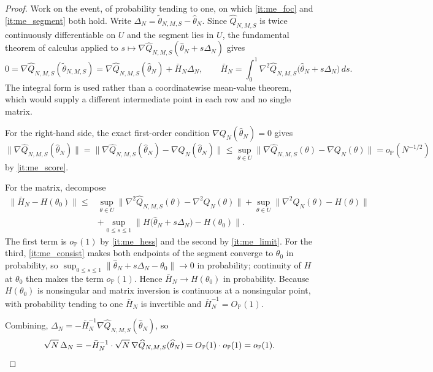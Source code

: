 \documentclass[11pt]{article}
\theoremstyle{definition}
\newcommand{\Pp}{\mathbb{P}}
\newcommand{\op}{o_{\Pp}}
\newcommand{\Op}{O_{\Pp}}
\newcommand{\thetao}{\theta_0}
\begin{document}
\begin{proof}
Work on the event, of probability tending to one, on which \ref{it:me_foc} and \ref{it:me_segment} both hold. Write $\Delta_N=\widetilde\theta_{N,M,S}-\widehat\theta_N$. Since $\widehat Q_{N,M,S}$ is twice continuously differentiable on $U$ and the segment lies in $U$, the fundamental theorem of calculus applied to $s\mapsto\nabla\widehat Q_{N,M,S}(\widehat\theta_N+s\Delta_N)$ gives
\[
0=\nabla\widehat Q_{N,M,S}(\widetilde\theta_{N,M,S})
=\nabla\widehat Q_{N,M,S}(\widehat\theta_N)+\bar H_N\Delta_N,
\qquad
\bar H_N=\int_0^1\nabla^2\widehat Q_{N,M,S}\bigl(\widehat\theta_N+s\Delta_N\bigr)\,ds .
\]
The integral form is used rather than a coordinatewise mean-value theorem, which would supply a different intermediate point in each row and no single matrix.

For the right-hand side, the exact first-order condition $\nabla Q_N(\widehat\theta_N)=0$ gives
\[
\bigl\|\nabla\widehat Q_{N,M,S}(\widehat\theta_N)\bigr\|
=\bigl\|\nabla\widehat Q_{N,M,S}(\widehat\theta_N)-\nabla Q_N(\widehat\theta_N)\bigr\|
\le\sup_{\theta\in U}\bigl\|\nabla\widehat Q_{N,M,S}(\theta)-\nabla Q_N(\theta)\bigr\|
=o_{\Pp}(N^{-1/2})
\]
by \ref{it:me_score}.

For the matrix, decompose
\begin{align*}
\bigl\|\bar H_N-H(\thetao)\bigr\|
\le{}&\sup_{\theta\in U}\bigl\|\nabla^2\widehat Q_{N,M,S}(\theta)-\nabla^2Q_N(\theta)\bigr\|
+\sup_{\theta\in U}\bigl\|\nabla^2Q_N(\theta)-H(\theta)\bigr\|\\
&+\sup_{0\le s\le1}\bigl\|H\bigl(\widehat\theta_N+s\Delta_N\bigr)-H(\thetao)\bigr\| .
\end{align*}
The first term is $o_{\Pp}(1)$ by \ref{it:me_hess} and the second by \ref{it:me_limit}. For the third, \ref{it:me_consist} makes both endpoints of the segment converge to $\thetao$ in probability, so $\sup_{0\le s\le1}\|\widehat\theta_N+s\Delta_N-\thetao\|\to0$ in probability; continuity of $H$ at $\thetao$ then makes the term $o_{\Pp}(1)$. Hence $\bar H_N\to H(\thetao)$ in probability. Because $H(\thetao)$ is nonsingular and matrix inversion is continuous at a nonsingular point, with probability tending to one $\bar H_N$ is invertible and $\bar H_N^{-1}=\Op(1)$.

Combining, $\Delta_N=-\bar H_N^{-1}\nabla\widehat Q_{N,M,S}(\widehat\theta_N)$, so
\[
\sqrt N\,\Delta_N
=-\bar H_N^{-1}\cdot\sqrt N\,\nabla\widehat Q_{N,M,S}(\widehat\theta_N)
=\Op(1)\cdot\op(1)
=\op(1). \qedhere
\]
\end{proof}
\end{document}
